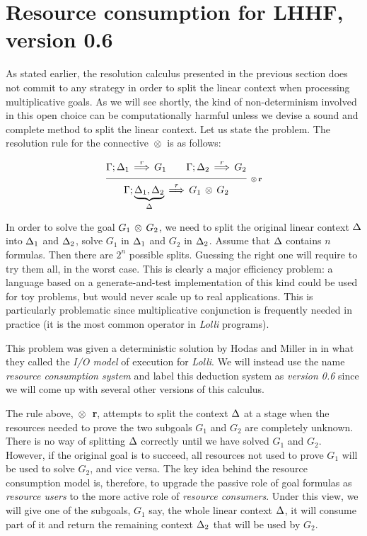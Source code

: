\hspace*{1em}


\newpage
\section{Resource consumption for LHHF, version 0.6}
\label{s:RC_VI}

As stated earlier, the resolution calculus presented in the previous section
does not commit to any strategy in order to split the linear context when
processing multiplicative goals. As we will see shortly, the kind of
non-determinism involved in this open choice can be computationally harmful
unless we devise a sound and complete method to split the linear context.
Let us state the problem. The resolution rule for the connective $\, \otimes \,$
is as follows:

$$\ruleII
   {\resd{\G;\D_1}{G_1}}
   {\resd{\G;\D_2}{G_2}}
   {\resd{\G;\underbrace{\D_1,\D_2}_\D}{G_1 \Times G_2}}
   {\Times r}
$$
   
In order to solve the goal $G_1 \, \otimes \, G_2$, we need to split the original
linear context $\Delta$ into $\Delta_1$ and $\Delta_2$, solve $G_1$ in $\Delta_1$ and $G_2$ in
$\Delta_2$.  Assume that $\Delta$ contains $n$ formulas. Then there are $2^n$
possible splits.  Guessing the right one will require to try them all, in the
worst case.  This is clearly a major efficiency problem: a language based on
a generate-and-test implementation of this kind could be used for toy
problems, but would never scale up to real applications. This is particularly
problematic since multiplicative conjunction is frequently needed in practice
(it is the most common operator in {\em Lolli\/} programs).

This problem was given a deterministic solution by Hodas and Miller in
\cite{HoM94} in what they called the {\em I/O model\/} of execution for
{\em Lolli}. We will instead use the name {\em resource consumption system\/}
and label this deduction system as {\em version 0.6\/} since we will come up
with several other versions of this calculus.
  
The rule above, {\bf $\, \otimes \,$ r}, attempts to split the context $\Delta$ at a
stage when the resources needed to prove the two subgoals $G_1$ and $G_2$ are
completely unknown. There is no way of splitting $\Delta$ correctly until we have
solved $G_1$ and $G_2$. However, if the original goal is to succeed, all
resources not used to prove $G_1$ will be used to solve $G_2$, and vice
versa.  The key idea behind the resource consumption model is, therefore, to
upgrade the passive role of goal formulas as {\em resource users\/} to the
more active role of {\em resource consumers}. Under this view, we will give
one of the subgoals, $G_1$ say, the whole linear context $\Delta$, it will
consume part of it and return the remaining context $\Delta_2$ that will be
used by $G_2$.
  
